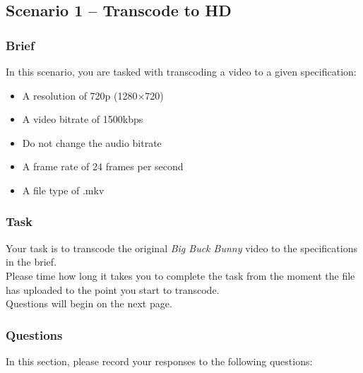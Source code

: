 \subsection{Scenario 1 – Transcode to HD}
\subsubsection{Brief}
In this scenario, you are tasked with transcoding a video to a given specification:
\begin{itemize}
    \item A resolution of 720p (1280×720)
    \item A video bitrate of 1500kbps
    \item Do not change the audio bitrate 
    \item A frame rate of 24 frames per second
    \item A file type of .mkv
\end{itemize}

\subsubsection{Task}
Your task is to transcode the original \emph{Big Buck Bunny} video to the specifications in the brief. \\
Please time how long it takes you to complete the task from the moment the file has uploaded to the point you start to transcode. \\
Questions will begin on the next page.

\clearpage

\subsubsection{Questions}

In this section, please record your responses to the following questions:

